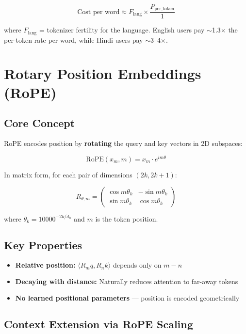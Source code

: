 \documentclass[11pt,a4paper]{article}
\begin{document}
$$\text{Cost per word} \approx F_{\text{lang}} \times \frac{P_{\text{per\_token}}}{1}$$

where $F_{\text{lang}}$ = tokenizer fertility for the language. English users pay $\sim$1.3$\times$ the per-token rate per word, while Hindi users pay $\sim$3--4$\times$.

\section{Rotary Position Embeddings (RoPE)}

\subsection{Core Concept}

RoPE encodes position by \textbf{rotating} the query and key vectors in 2D subspaces:

$$\text{RoPE}(x_m, m) = x_m \cdot e^{im\theta}$$

In matrix form, for each pair of dimensions $(2k, 2k{+}1)$:

$$R_{\theta,m} = \begin{pmatrix} \cos m\theta_k & -\sin m\theta_k \\ \sin m\theta_k & \cos m\theta_k \end{pmatrix}$$

where $\theta_k = 10000^{-2k/d_h}$ and $m$ is the token position.

\subsection{Key Properties}

\begin{itemize}[itemsep=1pt]
  \item \textbf{Relative position:} $\langle R_m q, R_n k \rangle$ depends only on $m - n$
  \item \textbf{Decaying with distance:} Naturally reduces attention to far-away tokens
  \item \textbf{No learned positional parameters} --- position is encoded geometrically
\end{itemize}

\subsection{Context Extension via RoPE Scaling}
\end{document}
